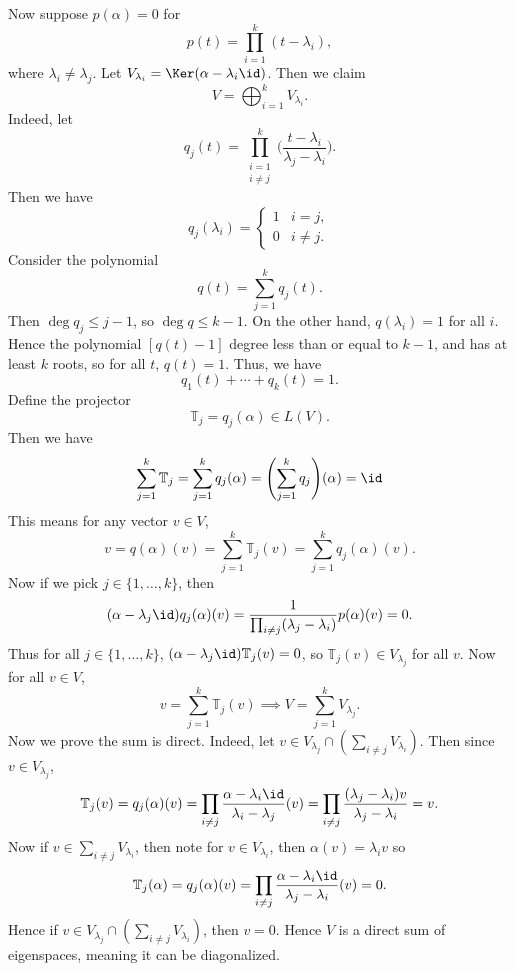 \documentclass[12pt]{article}
\begin{document}
\begin{proofbox}
	Now suppose $p(\alpha) = 0$ for 
	\[
		p(t) = \prod_{i = 1}^{k}(t - \lambda_i)
	,\]
	where $\lambda_i \neq \lambda_j$. Let $V_{\lambda_i} = \Ker(\alpha - \lambda_i \id)$. Then we claim
	\[
	V = \bigoplus_{i = 1}^{k} V_{\lambda_i}
	.\]
	Indeed, let
	\[
		q_j(t) = \prod_{\substack{i = 1 \\i \neq j}}^{k} \biggl( \frac{t - \lambda_i}{\lambda_j- \lambda_i} \biggr)
	.\]
	Then we have
	\[
		q_j(\lambda_i) =
		\begin{cases}
			1 & i = j, \\
			0 & i \neq j.
		\end{cases}
	\]
	Consider the polynomial
	\[
		q(t) = \sum_{j = 1}^{k} q_j(t)
	.\]
	Then $\deg q_j \leq j-1$, so $\deg q \leq k-1$. On the other hand, $q(\lambda_i) = 1$ for all $i$. Hence the polynomial $[q(t) - 1]$ degree less than or equal to $k-1$, and has at least $k$ roots, so for all $t$, $q(t) = 1$. Thus, we have
	\[
		q_1(t) + \cdots + q_k(t) = 1
	.\]
	Define the projector
	\[
		\mathbb{T}_j = q_j(\alpha) \in L(V)
	.\]
	Then we have
	\begin{align*}
		\sum_{j = 1}^{k} \mathbb{T}_j = \sum_{j = 1}^{k} q_j(\alpha) = \Biggl( \sum_{j = 1}^{k} q_j \Biggr) (\alpha) = \id
	\end{align*}
	This means for any vector $v \in V$,
	\[
		v = q(\alpha)(v) = \sum_{j = 1}^{k} \mathbb{T}_j(v) = \sum_{j = 1}^{k} q_j(\alpha)(v)
	.\]
	Now if we pick $j \in \{1, \ldots, k\}$, then
	 \[
		 (\alpha - \lambda_j \id) q_j(\alpha)(v) = \frac{1}{\prod_{i \neq j}(\lambda_j - \lambda_i)} p(\alpha)(v) = 0
	.\]
	Thus for all $j \in \{1, \ldots, k\}$, $(\alpha - \lambda_j \id)\mathbb{T}_j(v) = 0$, so $\mathbb{T}_j(v) \in V_{\lambda_j}$ for all $v$. Now for all $v \in V$,
	\[
		v = \sum_{j = 1}^{k} \mathbb{T}_j(v) \implies V = \sum_{j = 1}^{k}V_{\lambda_j}.
	\]
	Now we prove the sum is direct. Indeed, let $v \in V_{\lambda_j} \cap (\sum_{i \neq j} V_{\lambda_i})$. Then since $v \in V_{\lambda_j}$,
	\[
		\mathbb{T}_j(v) = q_j(\alpha)(v) = \prod_{i \neq j} \frac{\alpha - \lambda_i \id}{\lambda_i - \lambda_j} (v) = \prod_{i \neq j} \frac{(\lambda_j - \lambda_i)v}{\lambda_j - \lambda_i} = v
	.\]
	Now if $v \in \sum_{i \neq j} V_{\lambda_i}$, then note for $v \in V_{\lambda_i}$, then $\alpha(v) = \lambda_i v$ so
	\[
		\mathbb{T}_j(\alpha) = q_j(\alpha)(v) = \prod_{i \neq j} \frac{\alpha - \lambda_i \id}{\lambda_j - \lambda_i}(v) = 0
	.\]
	Hence if $v \in V_{\lambda_j}\cap (\sum_{i \neq j} V_{\lambda_i})$, then $v = 0$. Hence $V$ is a direct sum of eigenspaces, meaning it can be diagonalized.
\end{proofbox}
\end{document}
